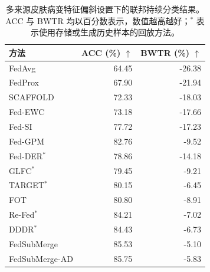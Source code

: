 \begin{table}[!htbp]
\centering
\setlength{\belowcaptionskip}{5pt}
\caption{多来源皮肤病变特征偏斜设置下的联邦持续分类结果。ACC 与 BWTR 均以百分数表示，数值越高越好；$^{\ast}$ 表示使用存储或生成历史样本的回放方法。}
\label{tab:fedsubmerge-main-feature}
\linespread{1}\selectfont
\fontsize{10.0bp}{12.5bp}\selectfont
\setlength{\tabcolsep}{5pt}
\renewcommand{\arraystretch}{1.10}
\begin{tabular*}{0.80\textwidth}{@{\extracolsep{\fill}}lrr@{}}
\toprule
方法 & \shortstack{ACC\\(\%) $\uparrow$} & \shortstack{BWTR\\(\%) $\uparrow$} \\
\midrule
FedAvg & 64.45 & -26.38 \\
FedProx & 67.90 & -21.94 \\
SCAFFOLD & 72.33 & -18.03 \\
Fed-EWC & 73.18 & -17.66 \\
Fed-SI & 77.72 & -17.23 \\
Fed-GPM & 82.76 & -9.52 \\
Fed-DER$^{\ast}$ & 78.86 & -14.18 \\
GLFC$^{\ast}$ & 79.45 & -9.21 \\
TARGET$^{\ast}$ & 80.15 & -6.45 \\
FOT & 80.80 & -8.91 \\
Re-Fed$^{\ast}$ & 84.21 & -7.02 \\
DDDR$^{\ast}$ & 84.43 & -6.73 \\
\midrule
FedSubMerge & 85.53 & -5.10 \\
FedSubMerge-AD & 85.75 & -5.83 \\
\bottomrule
\end{tabular*}
\end{table}
